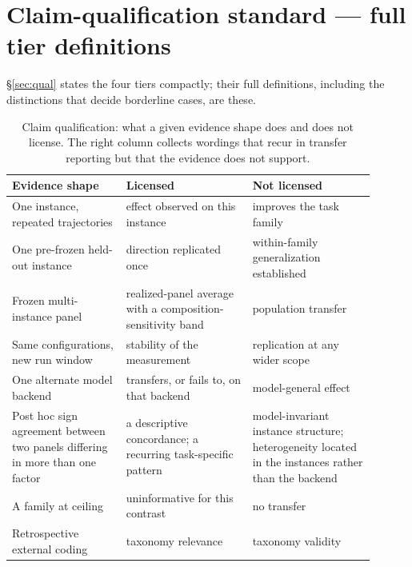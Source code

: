 \documentclass{article}
\begin{document}
\section{Claim-qualification standard --- full tier definitions}
\label{app:qual}
\S\ref{sec:qual} states the four tiers compactly; their full definitions, including the distinctions that decide borderline cases, are these.

\begin{table}[h]
\centering\small
\caption{Claim qualification: what a given evidence shape does and does not license. The right column collects wordings that recur in transfer reporting but that the evidence does not support.}
\label{tab:wording}
\begin{tabular}{p{0.29\linewidth} p{0.31\linewidth} p{0.30\linewidth}}
\toprule
Evidence shape & Licensed & Not licensed \\
\midrule
One instance, repeated trajectories & effect observed on this instance & improves the task family \\
One pre-frozen held-out instance & direction replicated once & within-family generalization established \\
Frozen multi-instance panel & realized-panel average with a composition-sensitivity band & population transfer \\
Same configurations, new run window & stability of the measurement & replication at any wider scope \\
One alternate model backend & transfers, or fails to, on that backend & model-general effect \\
Post hoc sign agreement between two panels differing in more than one factor & a descriptive concordance; a recurring task-specific pattern & model-invariant instance structure; heterogeneity located in the instances rather than the backend \\
A family at ceiling & uninformative for this contrast & no transfer \\
Retrospective external coding & taxonomy relevance & taxonomy validity \\
\bottomrule
\end{tabular}
\end{table}
\end{document}
